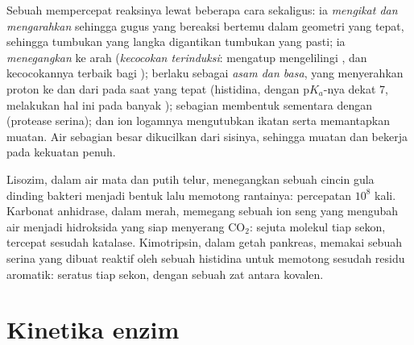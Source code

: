 \begin{proposition}\label{prop:b1:enzymes:mechanisms}
Sebuah  mempercepat reaksinya lewat beberapa cara sekaligus:
ia \emph{mengikat dan mengarahkan}  sehingga gugus yang
bereaksi bertemu dalam geometri yang tepat, sehingga tumbukan yang
langka digantikan tumbukan yang pasti; ia \emph{menegangkan} 
ke arah  (\emph{kecocokan terinduksi}:  mengatup mengelilingi , dan
kecocokannya terbaik bagi ); 
berlaku sebagai \emph{asam dan basa}, yang menyerahkan proton ke dan
dari  pada saat yang tepat (histidina, dengan p$K_a$-nya
dekat 7, melakukan hal ini pada banyak ); sebagian membentuk
\emph{} sementara dengan  (protease serina);
dan ion logamnya mengutubkan ikatan serta memantapkan muatan. Air
sebagian besar dikucilkan dari sisinya, sehingga muatan dan  bekerja pada kekuatan penuh.
\end{proposition}

\begin{example}\label{ex:b1:enzymes:three}
Lisozim, dalam air mata dan putih telur, menegangkan sebuah cincin gula
dinding bakteri menjadi bentuk  lalu memotong
rantainya: percepatan $10^8$ kali. Karbonat anhidrase, dalam  merah,
memegang sebuah ion seng yang mengubah air menjadi hidroksida yang siap
menyerang $\mathrm{CO_2}$: sejuta molekul tiap sekon,  tercepat
sesudah katalase. Kimotripsin, dalam getah pankreas, memakai sebuah
serina yang dibuat reaktif oleh sebuah histidina untuk memotong 
sesudah residu aromatik: seratus tiap sekon, dengan sebuah zat antara
kovalen.
\end{example}

\section{Kinetika enzim}

